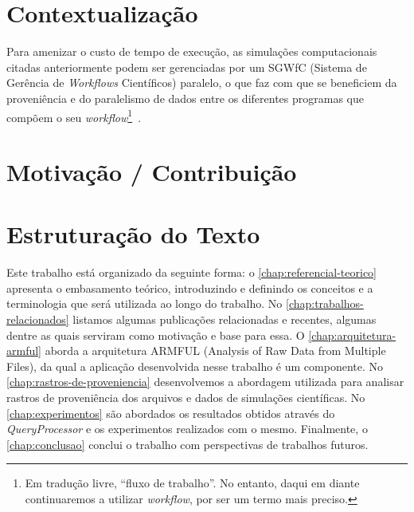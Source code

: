 \section{Contextualização}

Para amenizar o custo de tempo de execução, as simulações computacionais citadas anteriormente podem ser gerenciadas por um  SGWfC (Sistema de Gerência de \textit{Workflows} Científicos) paralelo, o que faz com que se beneficiem da proveniência e do paralelismo de dados entre os diferentes programas que compõem o seu \textit{workflow}\footnote{Em tradução livre, ``fluxo de trabalho''. No entanto, daqui em diante continuaremos a utilizar \textit{workflow}, por ser um termo mais preciso.}~\cite{bux2013parallelization}.



\section{Motivação / Contribuição} %



\section{Estruturação do Texto}

Este trabalho está organizado da seguinte forma:
o \autoref{chap:referencial-teorico} apresenta o embasamento teórico, introduzindo e definindo os conceitos e a terminologia que será utilizada ao longo do trabalho.
No \autoref{chap:trabalhos-relacionados} listamos algumas publicações relacionadas e recentes, algumas dentre as quais serviram como motivação e base para essa.
O \autoref{chap:arquitetura-armful} aborda a arquitetura  ARMFUL (Analysis of Raw Data from Multiple Files), da qual a aplicação desenvolvida nesse trabalho é um componente.
No \autoref{chap:rastros-de-proveniencia} desenvolvemos a abordagem utilizada para analisar rastros de proveniência dos arquivos e dados de simulações científicas.
No \autoref{chap:experimentos} são abordados os resultados obtidos através do \textit{QueryProcessor} e os experimentos realizados com o mesmo.
Finalmente, o \autoref{chap:conclusao} conclui o trabalho com perspectivas de trabalhos futuros.
